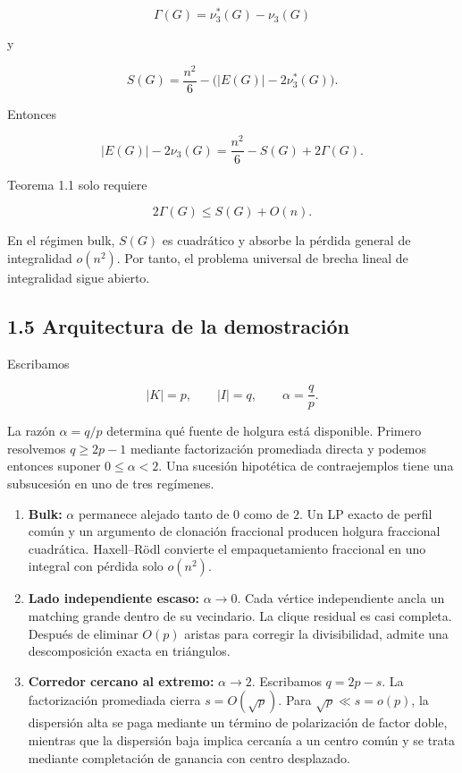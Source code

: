\documentclass[
  spanish,
  11pt,
  a4paper,
]{article}
\begin{document}
\[
\Gamma(G)=\nu_3^*(G)-\nu_3(G)
\]

y

\[
S(G)=\frac{n^2}{6}-\bigl(|E(G)|-2\nu_3^*(G)\bigr).
\]

Entonces

\[
|E(G)|-2\nu_3(G)
=
\frac{n^2}{6}-S(G)+2\Gamma(G).
\tag{1.5}
\]

Teorema 1.1 solo requiere

\[
2\Gamma(G)\le S(G)+O(n).
\]

En el régimen bulk, \(S(G)\) es cuadrático y absorbe la pérdida general de integralidad \(o(n^2)\). Por tanto, el problema universal de brecha lineal de integralidad sigue abierto.

\subsection{1.5 Arquitectura de la demostración}\label{arquitectura-de-la-demostraciuxf3n}

Escribamos

\[
|K|=p,
\qquad
|I|=q,
\qquad
\alpha=\frac qp.
\]

La razón \(\alpha=q/p\) determina qué fuente de holgura está disponible. Primero resolvemos \(q\ge2p-1\) mediante factorización promediada directa y podemos entonces suponer \(0\le\alpha<2\). Una sucesión hipotética de contraejemplos tiene una subsucesión en uno de tres regímenes.

\begin{enumerate}
\def\labelenumi{\arabic{enumi}.}
\item
  \textbf{Bulk:} \(\alpha\) permanece alejado tanto de \(0\) como de \(2\). Un LP exacto de perfil común y un argumento de clonación fraccional producen holgura fraccional cuadrática. Haxell--Rödl convierte el empaquetamiento fraccional en uno integral con pérdida solo \(o(n^2)\).
\item
  \textbf{Lado independiente escaso:} \(\alpha\to0\). Cada vértice independiente ancla un matching grande dentro de su vecindario. La clique residual es casi completa. Después de eliminar \(O(p)\) aristas para corregir la divisibilidad, admite una descomposición exacta en triángulos.
\item
  \textbf{Corredor cercano al extremo:} \(\alpha\to2\). Escribamos \(q=2p-s\). La factorización promediada cierra \(s=O(\sqrt p)\). Para \(\sqrt p\ll s=o(p)\), la dispersión alta se paga mediante un término de polarización de factor doble, mientras que la dispersión baja implica cercanía a un centro común y se trata mediante completación de ganancia con centro desplazado.
\end{enumerate}
\end{document}
